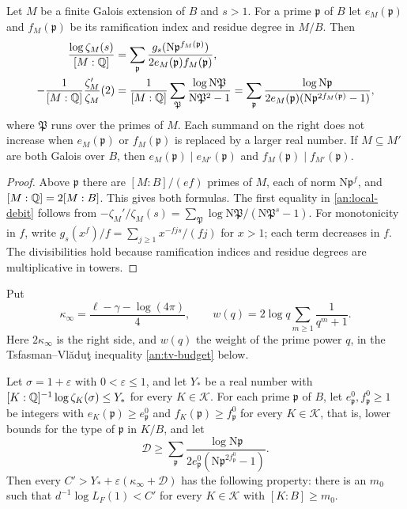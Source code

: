 \begin{lemma}\label{an:local-contribution}
Let $M$ be a finite Galois extension of $B$ and $s>1$. For a prime
$\mathfrak p$ of $B$ let $e_M(\mathfrak p)$ and $f_M(\mathfrak p)$ be its
ramification index and residue degree in $M/B$. Then
\begin{align}
 \frac{\log\zeta_M(s)}{[M:\mathbb Q]}
 &=\sum_{\mathfrak p}\frac{g_s(\mathrm N\mathfrak p^{f_M(\mathfrak p)})}
 {2e_M(\mathfrak p)f_M(\mathfrak p)},\label{an:local-sum}\\
 -\frac1{[M:\mathbb Q]}\frac{\zeta_M'}{\zeta_M}(2)
 &=\frac1{[M:\mathbb Q]}\sum_{\mathfrak P}\frac{\log\mathrm N\mathfrak P}
 {\mathrm N\mathfrak P^2-1}
 =\sum_{\mathfrak p}\frac{\log\mathrm N\mathfrak p}
 {2e_M(\mathfrak p)(\mathrm N\mathfrak p^{2f_M(\mathfrak p)}-1)},
 \label{an:local-debit}
\end{align}
where $\mathfrak P$ runs over the primes of $M$. Each summand on the right
does not increase when $e_M(\mathfrak p)$ or $f_M(\mathfrak p)$ is replaced
by a larger real number. If $M\subseteq M'$ are both Galois over $B$, then
$e_M(\mathfrak p)\mid e_{M'}(\mathfrak p)$ and
$f_M(\mathfrak p)\mid f_{M'}(\mathfrak p)$.
\end{lemma}

\begin{proof}
Above $\mathfrak p$ there are $[M:B]/(ef)$ primes of $M$, each of norm
$\mathrm N\mathfrak p^f$, and $[M:\mathbb Q]=2[M:B]$. This gives both formulas.
The first equality in \eqref{an:local-debit} follows from
$-\zeta_M'/\zeta_M(s)=\sum_{\mathfrak P}\log\mathrm N\mathfrak P/(\mathrm
N\mathfrak P^s-1)$. For monotonicity in $f$, write
$g_s(x^f)/f=\sum_{j\ge1}x^{-fjs}/(fj)$ for $x>1$; each term decreases in
$f$. The divisibilities hold because ramification indices and residue
degrees are multiplicative in towers.
\end{proof}

Put
\[
 \kappa_\infty=\frac{\ell-\gamma-\log(4\pi)}4,\qquad
 w(q)=2\log q\sum_{m\ge1}\frac1{q^m+1}.
\]
Here $2\kappa_\infty$ is the right side, and $w(q)$ the weight of the prime
power $q$, in the Tsfasman--Vl\u{a}du\c{t} inequality \eqref{an:tv-budget}
below.

\begin{proposition}\label{an:prime-budget}
Let $\sigma=1+\varepsilon$ with $0<\varepsilon\le1$, and let $Y_*$ be a real
number with $[K:\mathbb Q]^{-1}\log\zeta_K(\sigma)\le Y_*$ for every
$K\in\mathcal K$. For each prime $\mathfrak p$ of $B$, let
$e^0_{\mathfrak p},f^0_{\mathfrak p}\ge1$ be integers with
$e_K(\mathfrak p)\ge e^0_{\mathfrak p}$ and $f_K(\mathfrak p)\ge
f^0_{\mathfrak p}$ for every $K\in\mathcal K$, that is, lower bounds for
the type of $\mathfrak p$ in $K/B$, and let
\[
 \mathcal D\ge\sum_{\mathfrak p}\frac{\log\mathrm N\mathfrak p}
 {2e^0_{\mathfrak p}(\mathrm N\mathfrak p^{2f^0_{\mathfrak p}}-1)}.
\]
Then every $C'>Y_*+\varepsilon(\kappa_\infty+\mathcal D)$ has the following
property: there is an $m_0$ such that $d^{-1}\log L_F(1)<C'$ for every
$K\in\mathcal K$ with $[K:B]\ge m_0$.
\end{proposition}

